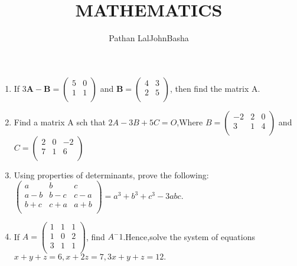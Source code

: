 \documentclass[12pt,-letter paper]{article}
\title{MATHEMATICS}
\author{Pathan LalJohnBasha}
\let\vec\mathbf{}
\let\vec\mathbf{}
\newcommand{\myvec}[1]{\ensuremath{\begin{pmatrix}#1\end{pmatrix}}}
\begin{document}
\maketitle
\begin{enumerate}
\section{Matrices}
\item If $3\vec{A}-\vec{B}=
\myvec{5 & 0 \\ 1 & 1 \\}$ and $\vec{B}=
\myvec{4 & 3\\2 & 5\\}$, then find the matrix A.
\item Find a matrix A sch that $2A - 3B + 5C = O$,Where $B = \myvec{-2 & 2 & 0\\3 & 1 & 4\\}$ and 
$C=\myvec{2 & 0 & -2\\7 & 1 & 6 \\}$
\item Using properties of determinants, prove the following:
\\$\myvec{
a & b & c\\
a-b & b-c & c-a\\
b+c & c+a & a+b \\
} = a^3 + b^3 + c^3 - 3abc. $
\item If $A = \myvec{
1 & 1  & 1\\
1 & 0 & 2\\
3 & 1& 1\\
}$, find $A^-1$.Hence,solve the system of equations $x + y + z = 6,x + 2z = 7,3x + y + z = 12.$

\end{enumerate}
\end{document}
